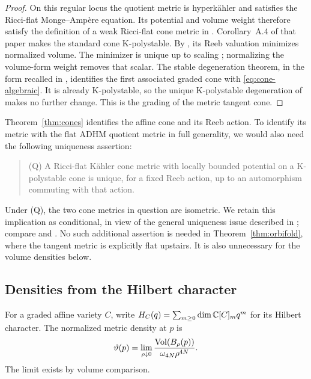 \begin{proof}
On this regular locus the quotient metric is hyperk\"ahler and satisfies
the Ricci-flat Monge--Amp\`ere equation. Its potential and volume weight
therefore satisfy the definition of a weak Ricci-flat cone metric in
\cite[Definitions~A.6--A.8]{LWX21}. Corollary~A.4 of that paper makes the
standard cone K-polystable. By \cite[Theorem~3.5]{LX18}, its Reeb valuation
minimizes normalized volume. The minimizer is unique up to scaling \cite[Theorem~2.4]{NO26};
normalizing the volume-form weight removes that scalar. The stable
degeneration theorem, in the form recalled in \cite[Section~2]{NO26},
identifies the first associated graded cone with
\eqref{eq:cone-algebraic}. It is already K-polystable, so the unique
K-polystable degeneration of \cite[Theorem~1.2]{LWX21} makes no further
change. This is the grading of the metric tangent cone.
\end{proof}

\begin{remark}\label{rem:cone-uniqueness}
Theorem~\ref{thm:cones} identifies the affine cone and its Reeb action.
To identify its metric with the flat ADHM quotient metric in full
generality, we would also need the following uniqueness assertion:
\begin{quote}
\textup{(Q)} A Ricci-flat K\"ahler cone metric with locally bounded
potential on a K-polystable cone is unique, for a fixed Reeb action,
up to an automorphism commuting with that action.
\end{quote}
Under \textup{(Q)}, the two cone metrics in question are isometric.
We retain this implication as conditional, in view of the general
uniqueness issue described in \cite[Remark~6.14]{NO26}; compare
\cite[Proposition~4.8]{DS17} and \cite[Theorem~A.12]{LWX21}.
No such additional assertion is needed in
Theorem~\ref{thm:orbifold}, where the tangent metric is explicitly flat
upstairs. It is also unnecessary for the volume densities below.
\end{remark}

\subsection{Densities from the Hilbert character}
For a graded affine variety $C$, write
$H_C(q)=\sum_{m\ge0}\dim\mathbb C[C]_m q^m$ for its Hilbert character.
The normalized metric density at $p$ is
\[
 \vartheta(p)=\lim_{\rho\downarrow0}
 \frac{\operatorname{Vol}(B_\rho(p))}{\omega_{4N}\rho^{4N}}.
\]
The limit exists by volume comparison.

